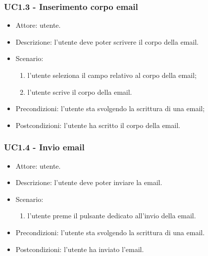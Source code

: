    \subsubsection{UC1.3 - Inserimento corpo email}
    \begin{itemize}
        \item Attore: utente.
        \item Descrizione: l'utente deve poter scrivere il corpo della email.
        \item Scenario:
        \begin{enumerate}
        \item l'utente seleziona il campo relativo al corpo della email;
        \item l'utente scrive il corpo della email.
        \end{enumerate}
        \item Precondizioni: l'utente sta svolgendo la scrittura di una email;
        \item Postcondizioni: l'utente ha scritto il corpo della email.
    \end{itemize}

    \subsubsection{UC1.4 - Invio email}
    \begin{itemize}
        \item Attore: utente.
        \item Descrizione: l'utente deve poter inviare la email.
        \item Scenario:
        \begin{enumerate}
        \item l'utente preme il pulsante dedicato all'invio della email.
        \end{enumerate}
        \item Precondizioni: l'utente sta svolgendo la scrittura di una email.
        \item Postcondizioni: l'utente ha inviato l'email.
    \end{itemize}

